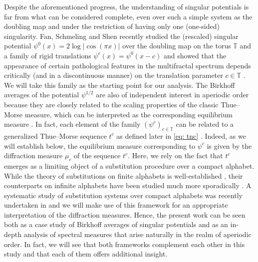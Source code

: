 \documentclass[11pt,reqno]{amsart}
\theoremstyle{plain}
\theoremstyle{definition}
\newcommand{\ts}{\hspace{0.5pt}}
\begin{document}
Despite the aforementioned progress, the understanding of singular potentials is far from what can be considered complete, even over such a simple system as the doubling map and under the restriction of having only one (one-sided) singularity.
Fan, Schmeling and Shen recently studied the (rescaled) singular potential $\psi^0(x) =2 \log |\cos(\pi x)|$ over the doubling map on the torus $ \mathbb{T}$ and a family of rigid translations $\psi^c(x) = \psi^0(x-c)$ and showed that the appearance of certain pathological features in the multifractal spectrum depends critically (and in a discontinuous manner) on the translation parameter $c\in  \mathbb{T}$ \cite{fan_generalized_2020, fan_generalized_2019}. We will take this family as the starting point for our analysis.
The Birkhoff averages of the potential $\psi^{1/2}$ are also of independent interest in aperiodic order because they are closely related to the scaling properties of the classic Thue{\ts}--Morse measure, which can be interpreted as the corresponding equilibrium measure \cite{BGKS, GLS}. 
In fact, each element of the family $(\psi^c)_{c \in \mathbb{T}}$ can be related to a generalized Thue{\ts}--Morse sequence $t^c$ as defined later in \eqref{eq: tnc} \cite{fan_generalized_2020}. Indeed, as we will establish below, the equilibrium measure corresponding to $\psi^c$ is given by the diffraction measure $\mu_c$ of the sequence $t^c$. Here, we rely on the fact that $t^c$ emerges as a limiting object of a substitution procedure over a compact alphabet.
While the theory of substitutions on finite alphabets is well-established \cite{baake,queffelec}, their counterparts on infinite alphabets have been studied much more sporadically \cite{DOP18,Fer06}.
A systematic study of substitution systems over compact alphabets was recently undertaken in \cite{MRW23,MRW} and we will make use of this framework for an appropriate interpretation of the diffraction measures.
Hence, the present work can be seen both as a case study of Birkhoff averages of singular potentials and as an in-depth analysis of spectral measures that arise naturally in the realm of aperiodic order. 
In fact, we will see that both frameworks complement each other in this study and that each of them offers additional insight.
\end{document}
